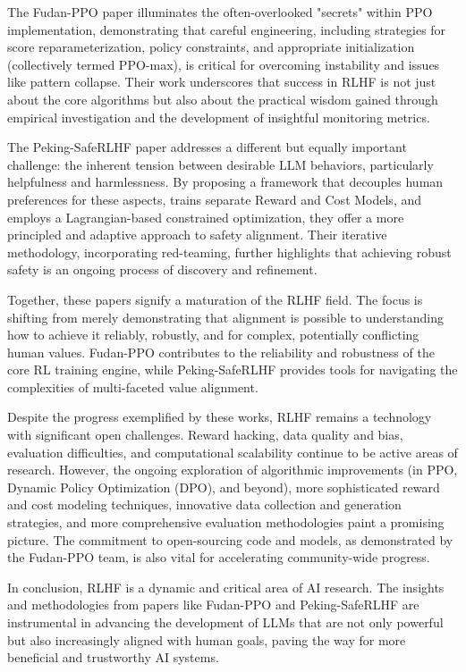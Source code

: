 \documentclass{article}
\begin{document}
The Fudan-PPO paper illuminates the often-overlooked "secrets" within PPO implementation, demonstrating that careful engineering, including strategies for score reparameterization, policy constraints, and appropriate initialization (collectively termed PPO-max), is critical for overcoming instability and issues like pattern collapse. Their work underscores that success in RLHF is not just about the core algorithms but also about the practical wisdom gained through empirical investigation and the development of insightful monitoring metrics.

The Peking-SafeRLHF paper addresses a different but equally important challenge: the inherent tension between desirable LLM behaviors, particularly helpfulness and harmlessness. By proposing a framework that decouples human preferences for these aspects, trains separate Reward and Cost Models, and employs a Lagrangian-based constrained optimization, they offer a more principled and adaptive approach to safety alignment. Their iterative methodology, incorporating red-teaming, further highlights that achieving robust safety is an ongoing process of discovery and refinement.

Together, these papers signify a maturation of the RLHF field. The focus is shifting from merely demonstrating that alignment is possible to understanding how to achieve it reliably, robustly, and for complex, potentially conflicting human values. Fudan-PPO contributes to the reliability and robustness of the core RL training engine, while Peking-SafeRLHF provides tools for navigating the complexities of multi-faceted value alignment.

Despite the progress exemplified by these works, RLHF remains a technology with significant open challenges. Reward hacking, data quality and bias, evaluation difficulties, and computational scalability continue to be active areas of research.\cite{Casper2023OpenProblems} However, the ongoing exploration of algorithmic improvements (in PPO, Dynamic Policy Optimization (DPO), and beyond), more sophisticated reward and cost modeling techniques, innovative data collection and generation strategies, and more comprehensive evaluation methodologies paint a promising picture. The commitment to open-sourcing code and models, as demonstrated by the Fudan-PPO team, is also vital for accelerating community-wide progress.  

In conclusion, RLHF is a dynamic and critical area of AI research. The insights and methodologies from papers like Fudan-PPO and Peking-SafeRLHF are instrumental in advancing the development of LLMs that are not only powerful but also increasingly aligned with human goals, paving the way for more beneficial and trustworthy AI systems.

\newpage


\end{document}
